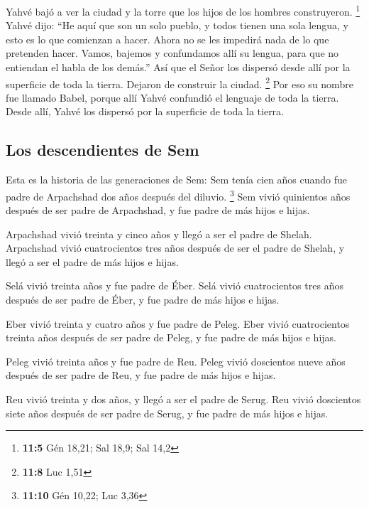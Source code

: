  Yahvé bajó a ver la ciudad y la torre que los hijos de
los hombres construyeron. \footnote{\textbf{11:5} Gén 18,21; Sal 18,9;
  Sal 14,2}  Yahvé dijo: ``He aquí que son un solo pueblo,
y todos tienen una sola lengua, y esto es lo que comienzan a hacer.
Ahora no se les impedirá nada de lo que pretenden hacer. 
Vamos, bajemos y confundamos allí su lengua, para que no entiendan el
habla de los demás.''  Así que el Señor los dispersó desde
allí por la superficie de toda la tierra. Dejaron de construir la
ciudad. \footnote{\textbf{11:8} Luc 1,51}  Por eso su
nombre fue llamado Babel, porque allí Yahvé confundió el lenguaje de
toda la tierra. Desde allí, Yahvé los dispersó por la superficie de toda
la tierra.

\hypertarget{los-descendientes-de-sem}{%
\subsection{Los descendientes de Sem}\label{los-descendientes-de-sem}}

 Esta es la historia de las generaciones de Sem: Sem
tenía cien años cuando fue padre de Arpachshad dos años después del
diluvio. \footnote{\textbf{11:10} Gén 10,22; Luc 3,36} 
Sem vivió quinientos años después de ser padre de Arpachshad, y fue
padre de más hijos e hijas.

 Arpachshad vivió treinta y cinco años y llegó a ser el
padre de Shelah.  Arpachshad vivió cuatrocientos tres
años después de ser el padre de Shelah, y llegó a ser el padre de más
hijos e hijas.

 Selá vivió treinta años y fue padre de Éber.
 Selá vivió cuatrocientos tres años después de ser padre
de Éber, y fue padre de más hijos e hijas.

 Eber vivió treinta y cuatro años y fue padre de Peleg.
 Eber vivió cuatrocientos treinta años después de ser
padre de Peleg, y fue padre de más hijos e hijas.

 Peleg vivió treinta años y fue padre de Reu.
 Peleg vivió doscientos nueve años después de ser padre
de Reu, y fue padre de más hijos e hijas.

 Reu vivió treinta y dos años, y llegó a ser el padre de
Serug.  Reu vivió doscientos siete años después de ser
padre de Serug, y fue padre de más hijos e hijas.

